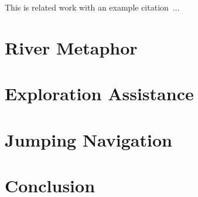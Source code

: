 This is related work with an example citation~\cite{Galyean1995}...

%


\section{River Metaphor}
\section{Exploration Assistance}
\section{Jumping Navigation}
\section{Conclusion}
%

%